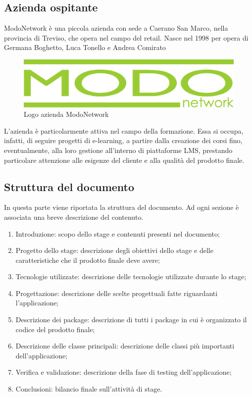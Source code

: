 \documentclass[../Tesi.tex]{subfiles}
\begin{document}
	\subsection{Azienda ospitante}
	ModoNetwork è una piccola azienda con sede a Caerano San Marco, nella provincia di Treviso, che opera nel campo del retail. Nasce nel 1998 per opera di Germana Boghetto, Luca Tonello e Andrea Comirato
	\begin{figure}[H]
		\centering
		\includegraphics[scale=0.1]{images/logoMN}
		\caption{Logo azienda ModoNetwork}
	\end{figure}
	L'azienda è particolarmente attiva nel campo della formazione. Essa si occupa, infatti, di seguire progetti di e-learning, a partire dalla creazione dei corsi fino, eventualmente, alla loro gestione all'interno di piattaforme LMS, prestando particolare attenzione alle esigenze del cliente e alla qualità del prodotto finale.

	\subsection{Struttura del documento}
		In questa parte viene riportata la struttura del documento. Ad ogni sezione è associata una breve descrizione del contenuto.
		\begin{enumerate}
			\item Introduzione: scopo dello stage e contenuti presenti nel documento;
			\item Progetto dello stage: descrizione degli obiettivi dello stage e delle caratteristiche che il prodotto finale deve avere;
			\item Tecnologie utilizzate: descrizione delle tecnologie utilizzate durante lo stage;
			\item Progettazione: descrizione delle scelte progettuali fatte riguardanti l'applicazione;
			\item Descrizione dei package: descrizione di tutti i package in cui è organizzato il codice del prodotto finale;
			\item Descrizione delle classe principali: descrizione delle classi più importanti dell'applicazione;
			\item Verifica e validazione: descrizione della fase di testing dell'applicazione;
			\item Conclusioni: bilancio finale sull'attività di stage.
		\end{enumerate}
\end{document}
